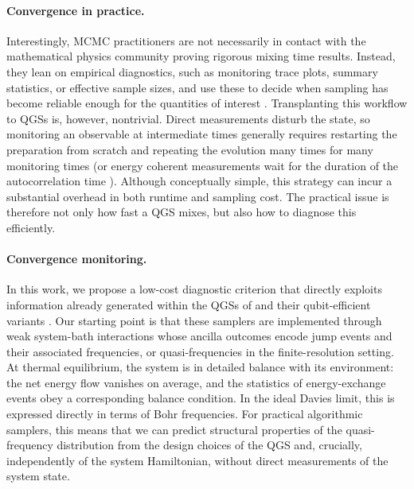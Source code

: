 \documentclass[showpacs,amsmath,amssymb,twocolumn,prx,superscriptaddress,10pt,aps,nofootinbib]{revtex4-2}
\begin{document}
\paragraph{Convergence in practice.} Interestingly, MCMC practitioners are not necessarily in contact with the mathematical physics community proving rigorous mixing time results. Instead, they lean on empirical diagnostics, such as monitoring trace plots, summary statistics, or effective sample sizes, and use these to decide when sampling has become reliable enough for the quantities of interest \cite{Vivekananda2019,HandbookMCMC2011}. Transplanting this workflow to QGSs is, however, nontrivial. Direct measurements disturb the state, so monitoring an observable at intermediate times generally requires restarting the preparation from scratch and repeating the evolution many times for many monitoring times (or energy coherent measurements wait for the duration of the autocorrelation time \cite{Jiang2026}). Although conceptually simple, this strategy can incur a substantial overhead in both runtime and sampling cost. The practical issue is therefore not only how fast a QGS mixes, but also how to diagnose this efficiently.

\paragraph{Convergence monitoring.} In this work, we propose a low-cost diagnostic criterion that directly exploits information already generated within the QGSs of \cite{chen2025efficient} and their qubit-efficient variants \cite{Ding2025}. Our starting point is that these samplers are implemented through weak system-bath interactions whose ancilla outcomes encode jump events and their associated frequencies, or quasi-frequencies in the finite-resolution setting. At thermal equilibrium, the system is in detailed balance with its environment: the net energy flow vanishes on average, and the statistics of energy-exchange events obey a corresponding balance condition. In the ideal Davies limit, this is expressed directly in terms of Bohr frequencies. For practical algorithmic samplers, this means that we can predict structural properties of the quasi-frequency distribution from the design choices of the QGS and, crucially, independently of the system Hamiltonian, without direct measurements of the system state.
\end{document}
